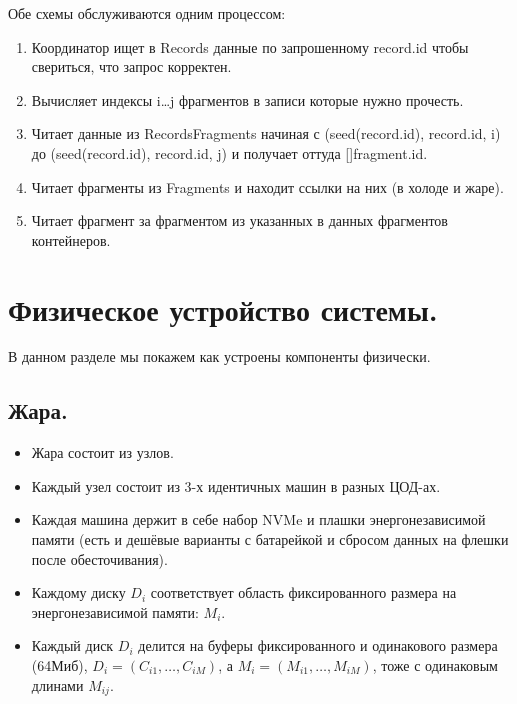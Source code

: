 Обе схемы обслуживаются одним процессом:

\begin{enumerate}
\def\labelenumi{\arabic{enumi}.}
\tightlist
\item
  Координатор ищет в Records данные по запрошенному record.id чтобы
  свериться, что запрос корректен.
\item
  Вычисляет индексы i\ldots j фрагментов в записи которые нужно
  прочесть.
\item
  Читает данные из RecordsFragments начиная с (seed(record.id),
  record.id, i) до (seed(record.id), record.id, j) и получает оттуда
  {[}{]}fragment.id.
\item
  Читает фрагменты из Fragments и находит ссылки на них (в холоде и
  жаре).
\item
  Читает фрагмент за фрагментом из указанных в данных фрагментов
  контейнеров.
\end{enumerate}

\section{Физическое устройство
системы.}\label{ux444ux438ux437ux438ux447ux435ux441ux43aux43eux435-ux443ux441ux442ux440ux43eux439ux441ux442ux432ux43e-ux441ux438ux441ux442ux435ux43cux44b.}

В данном разделе мы покажем как устроены компоненты физически.

\subsection{Жара.}\label{ux436ux430ux440ux430.}

\begin{itemize}
\tightlist
\item
  Жара состоит из узлов.
\item
  Каждый узел состоит из 3-х идентичных машин в разных ЦОД-ах.
\item
  Каждая машина держит в себе набор NVMe и плашки энергонезависимой
  памяти (есть и дешёвые варианты с батарейкой и сбросом данных на
  флешки после обесточивания).
\item
  Каждому диску \(D_i\) соответствует область фиксированного размера на
  энергонезависимой памяти: \(M_i\).
\item
  Каждый диск \(D_i\) делится на буферы фиксированного и одинакового
  размера (64Миб), \(D_i = \left( C_{i1},\ldots, C_{iM} \right)\), а
  \(M_i = \left( M_{i1}, \ldots, M_{iM}\right)\), тоже с одинаковым
  длинами \(M_{ij}\).
\end{itemize}

